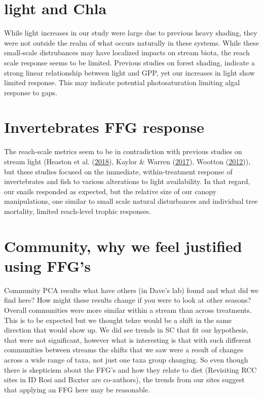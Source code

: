 \documentclass[double,12pt]{beavtex}
\begin{document}
  \section*{light and Chla}\label{light-and-chla}
  
  While light increases in our study were large due to previous heavy
  shading, they were not outside the realm of what occurs naturally in
  these systems. While these small-scale distrubances may have localized
  impacts on stream biota, the reach scale response seems to be limited.
  Previous studies on forest shading, indicate a strong linear
  relationship between light and GPP, yet our increases in light show
  limited response. This may indicate potential photosaturation limiting
  algal response to gaps.
  
  \section*{Invertebrates FFG response}\label{invertebrates-ffg-response}
  
  The reach-scale metrics seem to be in contradiction with previous
  studies on stream light (Heaston et al.
  (\protect\hyperlink{ref-Heaston2018}{2018}), Kaylor \& Warren
  (\protect\hyperlink{ref-Kaylor2017Eco}{2017}), Wootton
  (\protect\hyperlink{ref-Wootton2012}{2012})), but these studies focused
  on the immediate, within-treatment response of invertebrates and fish to
  various alterations to light availability. In that regard, our snails
  responded as expected, but the relative size of our canopy
  manipulations, one similar to small scale natural disturbances and
  individual tree mortality, limited reach-level trophic responses.
  
  \section*{Community, why we feel justified using
  FFG's}\label{community-why-we-feel-justified-using-ffgs}
  
  Community PCA results what have others (in Dave's lab) found and what
  did we find here? How might these results change if you were to look at
  other seasons? Overall communities were more similar within a stream
  than across treatments. This is to be expected but we thought tehre
  would be a shift in the same direction that would show up. We did see
  trends in SC that fit our hypothesis, that were not significant, however
  what is interesting is that with such different communities between
  streams the shifts that we saw were a result of changes across a wide
  range of taxa, not just one taxa group changing. So even though there is
  skepticism about the FFG's and how they relate to diet (Revisiting RCC
  sites in ID Rosi and Baxter are co-authors), the trends from our sites
  suggest that applying an FFG here may be reasonable.
  
\end{document}

